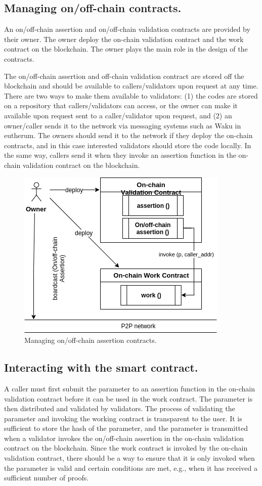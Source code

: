 \documentclass[runningheads]{llncs}
\begin{document}
\subsection{Managing on/off-chain contracts.}
An on/off-chain assertion and on/off-chain validation contracts are provided by their owner. The owner deploy the on-chain validation contract and the work contract on the blockchain. The owner plays the main role in the design of the contracts. 

The on/off-chain assertion and off-chain validation contract are stored off the blockchain and should be available to callers/validators upon request at any time. There are two ways to make them available to validators: (1) the codes are stored on a repository that callers/validators can access, or the owner can make it available upon request sent to a caller/validator upon request, and (2) an owner/caller sends it to the network via messaging systems such as Waku in eutherum. The owners should send it to the network if they deploy the on-chain contracts, and in this case interested validators should store the code locally. In the same way, callers send it when they invoke an assertion function in the on-chain validation contract on the blockchain.

\begin{figure}
\centering
\includegraphics[scale=.8]{owner}
\caption{Managing on/off-chain assertion contracts.}
\end{figure}

\subsection{Interacting with the smart contract.}
A caller must first submit the parameter to an assertion function in the on-chain validation contract before it can be used in the work contract. The parameter is then distributed and validated by validators. The process of validating the parameter and invoking the working contract is transparent to the user. It is sufficient to store the hash of the parameter, and the parameter is transmitted when a validator invokes the on/off-chain assertion in the on-chain validation contract on the blockchain. Since the work contract is invoked by the on-chain validation contract, there should be a way to ensure that it is only invoked when the parameter is valid and certain conditions are met, e.g., when it has received a sufficient number of proofs. 
\end{document}
